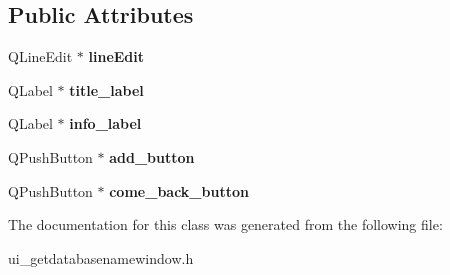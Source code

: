 \subsection*{Public Attributes}
\begin{DoxyCompactItemize}
\item 
\mbox{\label{class_ui___get_database_name_window_aa0b097e99fccc9a0d1dce24f4baf73a6}} 
Q\+Line\+Edit $\ast$ {\bfseries line\+Edit}
\item 
\mbox{\label{class_ui___get_database_name_window_a8f9ded3034ed51d5ca0506c229e227a7}} 
Q\+Label $\ast$ {\bfseries title\+\_\+label}
\item 
\mbox{\label{class_ui___get_database_name_window_a9a7bd6644ce7b668e0bb10349c48ee31}} 
Q\+Label $\ast$ {\bfseries info\+\_\+label}
\item 
\mbox{\label{class_ui___get_database_name_window_a061e2797af2bb551dbe0158c3d8f172f}} 
Q\+Push\+Button $\ast$ {\bfseries add\+\_\+button}
\item 
\mbox{\label{class_ui___get_database_name_window_a6f89ee4c6b8c056971a1c1e578f2d0e3}} 
Q\+Push\+Button $\ast$ {\bfseries come\+\_\+back\+\_\+button}
\end{DoxyCompactItemize}


The documentation for this class was generated from the following file\+:\begin{DoxyCompactItemize}
\item 
ui\+\_\+getdatabasenamewindow.\+h\end{DoxyCompactItemize}
